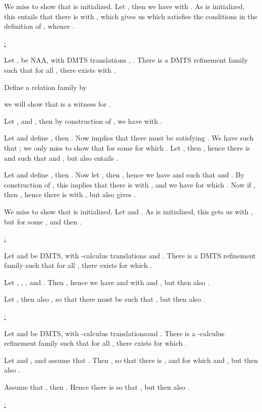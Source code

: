 \documentclass[twocolumn]{svjour3-dummy}
\newcommand*\NAA{NAA\xspace}
\begin{document}
  We miss to show that  is initialized.  Let , then
  we have  with .  As  is
  initialized, this entails that there is  with , which gives us  which satisfies the conditions in the definition of
  , whence .

  \pagebreak \noindent \underline{:}

  Let ,  be
  \NAA, with DMTS translations 
  , .  There is
  a DMTS refinement family  such that for all , there exists
   with .

  Define a relation family  by
  
  we will show that  is a witness for .

  Let ,  and , then by construction of , we have 
  with .

  Let  and define , then .  Now  implies that there must be  satisfying
  .  We have  such that ; we only miss to show that  for some  for which .  Let , then , hence there is  and  such that  and , but  also entails
  .

  Let  and define , then .  Now let , then , hence we have  and  such that  and .  By construction of
  , this implies that there is  with , and we have  for which .  Now if , then , hence there is  with , but  also
  gives .

  We miss to show that  is initialized.  Let  and
  .  As  is initialized, this gets us
   with , but  for some ,
  and then .

  \medskip \noindent \underline{:}

  Let  and
    be DMTS, with
  -calculus translations 
  and .  There is a DMTS
  refinement family
   such that
  for all , there exists  for which
  .

  Let , , , and
  .  Then , hence we
  have  and  with  and , but then
  also .

  Let , then also , so that
  there must be  such that , but then also .

  \medskip \noindent \underline{:}

  Let  and 
   be DMTS, with -calculus
  translations\linebreak[4] and .  There is a -calculus refinement family  such that for all
  , there exists  for which .

  Let  and , and assume that
  .  Then , so that
  there is ,  and  for which  and , but then also .

  Assume that , then .  Hence
  there is  so that , but then also .

  \medskip \noindent \underline{:}
\end{document}
